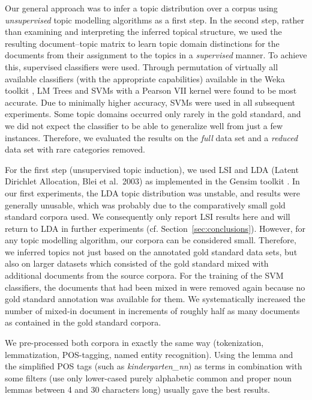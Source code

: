 \documentclass[11pt]{article}
\begin{document}
Our general approach was to infer a topic distribution over a corpus using \textit{unsupervised} topic modelling algorithms as a first step.
In the second step, rather than examining and interpreting the inferred topical structure, we used the resulting document--topic matrix to learn topic domain distinctions for the documents from their assignment to the topics in a \textit{supervised} manner.
To achieve this, supervised classifiers were used.
Through permutation of virtually all available classifiers (with the appropriate capabilities) available in the Weka toolkit \cite{HallWitten2011}, LM Trees \cite{LandwehrEa2005} and SVMs with a Pearson VII kernel \cite{UstunEa2006} were found to be most accurate.
Due to minimally higher accuracy, SVMs were used in all subsequent experiments.
Some topic domains occurred only rarely in the gold standard, and we did not expect the classifier to be able to generalize well from just a few instances.
Therefore, we evaluated the results on the \textit{full} data set and a \textit{reduced} data set with rare categories removed.

For the first step (unsupervised topic induction), we used LSI and LDA (Latent Dirichlet Allocation, Blei et al.\ 2003\nocite{BleiEa2003}) as implemented in the Gensim toolkit \cite{RehurekSojka2010}.
In our first experiments, the LDA topic distribution was unstable, and results were generally unusable, which was probably due to the comparatively small gold standard corpora used.
We consequently only report LSI results here and will return to LDA in further experiments (cf. Section~\ref{sec:conclusions}).
However, for any topic modelling algorithm, our corpora can be considered small.
Therefore, we inferred topics not just based on the annotated gold standard data sets, but also on larger datasets which consisted of the gold standard mixed with additional documents from the source corpora.
For the training of the SVM classifiers, the documents that had been mixed in were removed again because no gold standard annotation was available for them.
We systematically increased the number of mixed-in document in increments of roughly half as many documents as contained in the gold standard corpora.

We pre-processed both corpora in exactly the same way (tokenization, lemmatization, POS-tagging, named entity recognition).
Using the lemma and the simplified POS tags (such as \textit{kindergarten\_nn}) as terms in combination with some filters (use only lower-cased purely alphabetic common and proper noun lemmas between 4 and 30 characters long) usually gave the best results.
\end{document}
